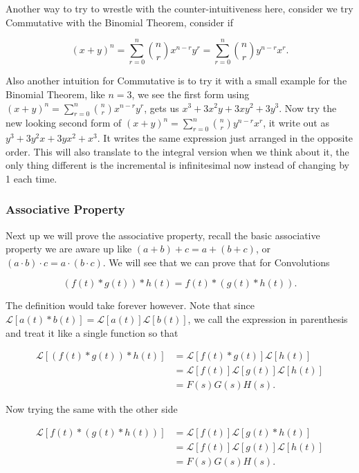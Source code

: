 \documentclass[12pt]{article}
\newcommand{\lp}{\mathscr{L}}
\begin{document}
Another way to try to wrestle with the counter-intuitiveness here, consider we try Commutative with the Binomial Theorem, consider if

\begin{equation*}
    (x+y)^n = \sum_{r=0}^{n} \binom{n}{r} x^{n-r}y^r = \sum_{r=0}^{n} \binom{n}{r} y^{n-r}x^r.
\end{equation*}

Also another intuition for Commutative is to try it with a small example for the Binomial Theorem, like $n=3$, we see the first form using $(x+y)^n = \sum_{r=0}^{n} \binom{n}{r} x^{n-r}y^r$, gets us $x^3+3x^2y+3xy^2+3y^3$. Now try the new looking second form of $(x+y)^n = \sum_{r=0}^{n} \binom{n}{r} y^{n-r}x^r$, it write out as $y^3+3y^2x+3yx^2+x^3$. It writes the same expression just arranged in the opposite order. This will also translate to the integral version when we think about it, the only thing different is the incremental is infinitesimal now instead of changing by 1 each time. \\

\subsubsection{Associative Property}

Next up we will prove the associative property, recall the basic associative property we are aware up like $(a+b)+c=a+(b+c)$, or $(a\cdot b) \cdot c = a \cdot (b \cdot c)$. We will see that we can prove that for Convolutions

\begin{equation*}
    (f(t) \ast g(t)) \ast h(t) = f(t) \ast (g(t) \ast h(t)).
\end{equation*}

The definition would take forever however. Note that since $\lp[a(t) \ast b(t)]=\lp[a(t)]\lp[b(t)]$, we call the expression in parenthesis and treat it like a single function so that

\begin{align*}
    \lp[(f(t) \ast g(t)) \ast h(t)] &= \lp[f(t) \ast g(t)]\lp[h(t)] \\
    &= \lp[f(t)]\lp[g(t)]\lp[h(t)] \\
    &=F(s)G(s)H(s).
\end{align*}

Now trying the same with the other side

\begin{align*}
    \lp[f(t) \ast (g(t) \ast h(t))] &= \lp[f(t)] \lp[g(t) \ast h(t)] \\
    &= \lp[f(t)]\lp[g(t)]\lp[h(t)] \\
    &=F(s)G(s)H(s).
\end{align*}
\end{document}

